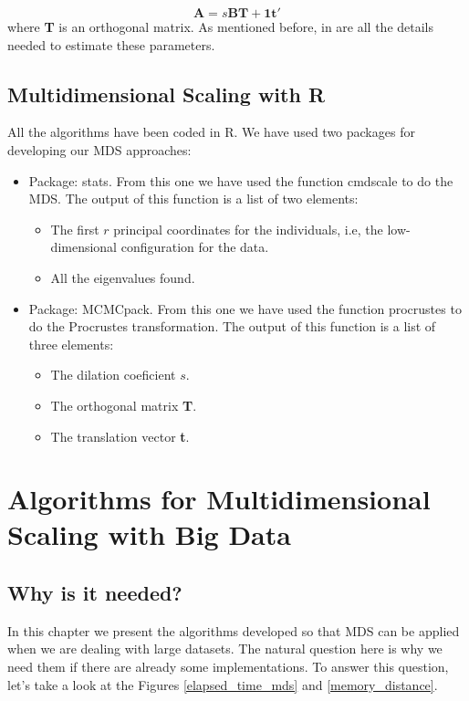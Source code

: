 \documentclass[11pt]{report}
\begin{document}
\[
\mathbf{A} = s \mathbf{B} \mathbf{T} + \mathbf{1t}'
\]
where \textbf{T} is an orthogonal matrix. As mentioned before, 
in  are all the details needed to estimate 
these parameters.

\section{Multidimensional Scaling with \textsf{R}}

All the algorithms have been coded in \textsf{R}. We have used two 
packages for developing our MDS approaches:

\begin{itemize}
\item Package: \textsf{stats}. From this one we have used the function 
\textsf{cmdscale} to do the MDS. The output of this function is a list of 
two elements:
\begin{itemize}
\item The first $r$ principal coordinates for the individuals, i.e,
the low-dimensional configuration for the data.
\item All the eigenvalues found.
\end{itemize}
\item Package: \textsf{MCMCpack}. From this one we have used the function 
\textsf{procrustes} to do the Procrustes transformation. The output of 
this function is a list of three elements:
\begin{itemize}
\item The dilation coeficient $s$.
\item The orthogonal matrix \textbf{T}.
\item The translation vector \textbf{t}.
\end{itemize}
\end{itemize}

\chapter{Algorithms for Multidimensional Scaling with Big Data}

\section{Why is it needed?}
In this chapter we present the algorithms developed so that MDS can be applied
when we are dealing with large datasets. The natural question here is why we need 
them if there are already some implementations. To answer this question, let's 
take a look at the Figures \ref{elapsed_time_mds} and \ref{memory_distance}.
\end{document}
